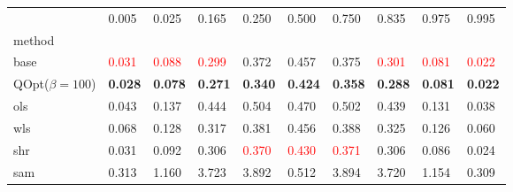\begin{tabular}{llllllllll}
\toprule
 & 0.005 & 0.025 & 0.165 & 0.250 & 0.500 & 0.750 & 0.835 & 0.975 & 0.995 \\
method &  &  &  &  &  &  &  &  &  \\
\midrule
base & \textcolor{red}{0.031} & \textcolor{red}{0.088} & \textcolor{red}{0.299} & 0.372 & 0.457 & 0.375 & \textcolor{red}{0.301} & \textcolor{red}{0.081} & \textcolor{red}{0.022} \\
\midrule
QOpt($\beta=100$) & \textbf{0.028} & \textbf{0.078} & \textbf{0.271} & \textbf{0.340} & \textbf{0.424} & \textbf{0.358} & \textbf{0.288} & \textbf{0.081} & \textbf{0.022} \\
ols & 0.043 & 0.137 & 0.444 & 0.504 & 0.470 & 0.502 & 0.439 & 0.131 & 0.038 \\
wls & 0.068 & 0.128 & 0.317 & 0.381 & 0.456 & 0.388 & 0.325 & 0.126 & 0.060 \\
shr & 0.031 & 0.092 & 0.306 & \textcolor{red}{0.370} & \textcolor{red}{0.430} & \textcolor{red}{0.371} & 0.306 & 0.086 & 0.024 \\
sam & 0.313 & 1.160 & 3.723 & 3.892 & 0.512 & 3.894 & 3.720 & 1.154 & 0.309 \\
\bottomrule
\end{tabular}